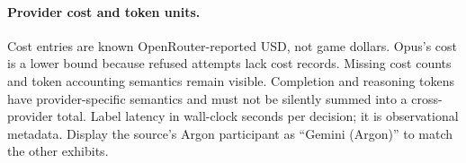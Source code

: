 \paragraph{Provider cost and token units.}
Cost entries are known OpenRouter-reported USD, not game dollars. Opus's cost
is a lower bound because refused attempts lack cost records. Missing cost
counts and token accounting semantics remain visible. Completion and reasoning
tokens have provider-specific semantics and must not be silently summed into
a cross-provider total. Label latency in wall-clock seconds per decision;
it is observational metadata. Display the source's Argon participant as
``Gemini (Argon)'' to match the other exhibits.
